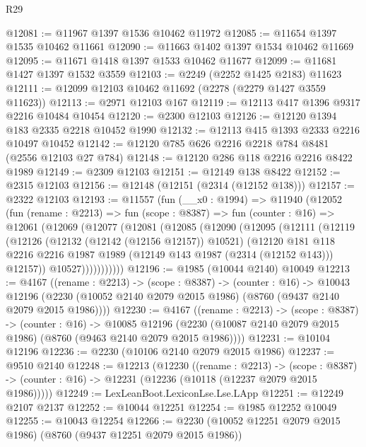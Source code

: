 \begin{lexlean}{R29}
\begin{coremodule}
@12081 := @11967 @1397 @1536 @10462 @11972
@12085 := @11654 @1397 @1535 @10462 @11661
@12090 := @11663 @1402 @1397 @1534 @10462 @11669
@12095 := @11671 @1418 @1397 @1533 @10462 @11677
@12099 := @11681 @1427 @1397 @1532 @3559
@12103 := @2249 (@2252 @1425 @2183) @11623
@12111 := @12099 @12103 @10462 @11692 (@2278 (@2279 @1427 @3559 @11623))
@12113 := @2971 @12103 @167
@12119 := @12113 @417 @1396 @9317 @2216 @10484 @10454
@12120 := @2300 @12103
@12126 := @12120 @1394 @183 @2335 @2218 @10452 @1990
@12132 := @12113 @415 @1393 @2333 @2216 @10497 @10452
@12142 := @12120 @785 @626 @2216 @2218 @784 @8481 (@2556 @12103 @27 @784)
@12148 := @12120 @286 @118 @2216 @2216 @8422 @1989
@12149 := @2309 @12103
@12151 := @12149 @138 @8422
@12152 := @2315 @12103
@12156 := @12148 (@12151 (@2314 (@12152 @138)))
@12157 := @2322 @12103
@12193 := @11557
    (fun (__x0 : @1994) =>
    @11940
      (@12052
        (fun (rename : @2213) =>
        fun (scope : @8387) =>
        fun (counter : @16) =>
        @12061
          (@12069
            (@12077
              (@12081
                (@12085
                  (@12090
                    (@12095
                      (@12111
                        (@12119
                          (@12126
                            (@12132 (@12142 (@12156 @12157)) @10521)
                            (@12120
                              @181
                              @118
                              @2216
                              @2216
                              @1987
                              @1989
                              (@12149 @143 @1987 (@2314 (@12152 @143)))
                              @12157))
                          @10527)))))))))))
@12196 := @1985 (@10044 @2140) @10049
@12213 := @4167
    ((rename : @2213) ->
    (scope : @8387) ->
    (counter : @16) ->
    @10043 @12196 (@2230 (@10052 @2140 @2079 @2015 @1986) (@8760 (@9437 @2140 @2079 @2015 @1986))))
@12230 := @4167
    ((rename : @2213) ->
    (scope : @8387) ->
    (counter : @16) ->
    @10085 @12196 (@2230 (@10087 @2140 @2079 @2015 @1986) (@8760 (@9463 @2140 @2079 @2015 @1986))))
@12231 := @10104 @12196
@12236 := @2230 (@10106 @2140 @2079 @2015 @1986)
@12237 := @9510 @2140
@12248 := @12213
    (@12230
      ((rename : @2213) ->
      (scope : @8387) -> (counter : @16) -> @12231 (@12236 (@10118 (@12237 @2079 @2015 @1986)))))
@12249 := LexLeanBoot.LexiconLse.Lse.LApp
@12251 := @12249 @2107 @2137
@12252 := @10044 @12251
@12254 := @1985 @12252 @10049
@12255 := @10043 @12254
@12266 := @2230 (@10052 @12251 @2079 @2015 @1986) (@8760 (@9437 @12251 @2079 @2015 @1986))

\end{coremodule}
\end{lexlean}
